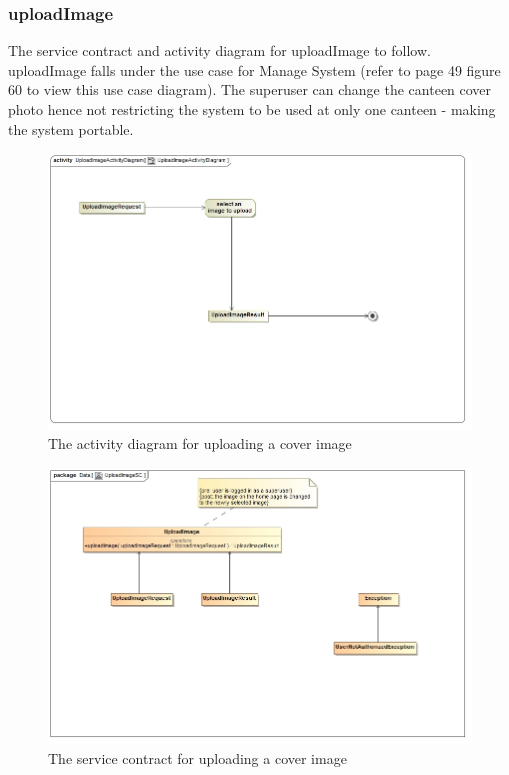 \documentclass[a4paper,12pt]{report}
\begin{document}
\subsubsection{uploadImage}
The service contract and activity diagram for uploadImage to follow. uploadImage falls under the use case for Manage System (refer to page 49 figure 60 to view this use case diagram). The superuser can change the canteen cover photo hence not restricting the system to be used at only one canteen - making the system portable. 
\begin{figure}[H]
  \centering
    \includegraphics[width=1.0\textwidth]{../images/UploadImageActivityDiagram.jpg}
    \caption{The activity diagram for uploading a cover image} 
\end{figure}

\begin{figure}[H]
	\centering
	\includegraphics[width=1.0\textwidth]{../images/UploadImageSC.jpg}
	\caption{The service contract for uploading a cover image}
\end{figure}
\end{document}
